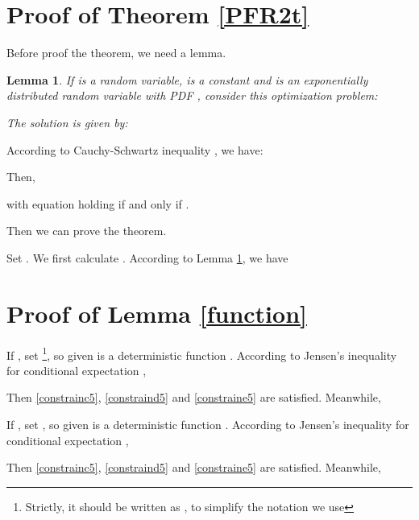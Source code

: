 \documentclass[12pt, draftclsnofoot, journal, letterpaper, onecolumn]{IEEEtran}
\newtheorem{lemma}{Lemma}[section]
\begin{document}
\section{Proof of Theorem \ref{PFR2t}}\label{PFR2tproof}
Before proof the theorem, we need a lemma.
\begin{lemma}\label{min}
If  is a random variable,  is a constant and  is an exponentially distributed random variable with PDF  , consider this optimization problem:

The solution is given by:

\end{lemma}
\begin{IEEEproof}
According to Cauchy-Schwartz inequality \cite{probability}, we have:

Then,

with equation holding if and only if .
\end{IEEEproof}

Then we can prove the theorem.
\begin{IEEEproof}
Set .
We first calculate . According to Lemma \ref{min}, we have


\end{IEEEproof}


\section{Proof of Lemma \ref{function}}\label{functionproof}


\begin{IEEEproof}
If , set   \footnote{Strictly, it should be written as , to simplify the notation we use }, so given  is a deterministic function \cite{probabilityross}. According to Jensen's inequality for conditional expectation \cite{probability},

Then \eqref{constrainc5}, \eqref{constraind5} and \eqref{constraine5} are satisfied.
Meanwhile,

If , set , so given  is a deterministic function \cite{probabilityross}. According to Jensen's inequality for conditional expectation \cite{probability},

Then \eqref{constrainc5}, \eqref{constraind5} and \eqref{constraine5} are satisfied.
Meanwhile,

\end{IEEEproof}









\end{document}
